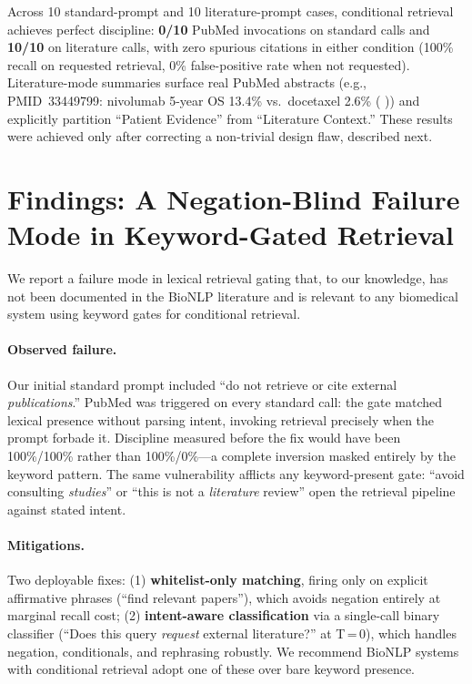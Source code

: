 \documentclass[11pt]{article}
\begin{document}
Across 10 standard-prompt and 10 literature-prompt cases, conditional retrieval achieves perfect discipline: \textbf{0/10} PubMed invocations on standard calls and \textbf{10/10} on literature calls, with zero spurious citations in either condition (100\% recall on requested retrieval, 0\% false-positive rate when not requested). Literature-mode summaries surface real PubMed abstracts (e.g., PMID~33449799: nivolumab 5-year OS 13.4\% vs.\ docetaxel 2.6\% (\citeauthor{brahmer2023nivolumab} \citeyear{brahmer2023nivolumab})) and explicitly partition ``Patient Evidence'' from ``Literature Context.'' These results were achieved only after correcting a non-trivial design flaw, described next.

\section{Findings: A Negation-Blind Failure Mode in Keyword-Gated Retrieval}
\label{sec:findings}

We report a failure mode in lexical retrieval gating that, to our knowledge, has not been documented in the BioNLP literature and is relevant to any biomedical system using keyword gates for conditional retrieval.

\paragraph{Observed failure.}
Our initial standard prompt included ``do not retrieve or cite external \emph{publications}.'' PubMed was triggered on every standard call: the gate matched lexical presence without parsing intent, invoking retrieval precisely when the prompt forbade it. Discipline measured before the fix would have been 100\%/100\% rather than 100\%/0\%—a complete inversion masked entirely by the keyword pattern. The same vulnerability afflicts any keyword-present gate: ``avoid consulting \emph{studies}'' or ``this is not a \emph{literature} review'' open the retrieval pipeline against stated intent.

\paragraph{Mitigations.}
Two deployable fixes: (1) \textbf{whitelist-only matching}, firing only on explicit affirmative phrases (``find relevant papers''), which avoids negation entirely at marginal recall cost; (2) \textbf{intent-aware classification} via a single-call binary classifier (``Does this query \emph{request} external literature?'' at T\,=\,0), which handles negation, conditionals, and rephrasing robustly. We recommend BioNLP systems with conditional retrieval adopt one of these over bare keyword presence.
\end{document}
